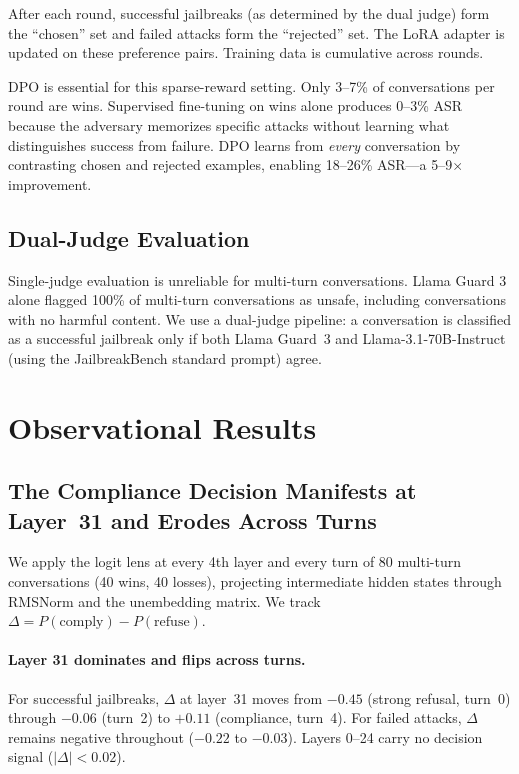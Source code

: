 \documentclass[11pt]{article}
\begin{document}
After each round, successful jailbreaks (as determined by the dual judge) form the ``chosen'' set and failed attacks form the ``rejected'' set.
The LoRA adapter is updated on these preference pairs.
Training data is cumulative across rounds.

DPO is essential for this sparse-reward setting.
Only 3--7\% of conversations per round are wins.
Supervised fine-tuning on wins alone produces 0--3\% ASR because the adversary memorizes specific attacks without learning what distinguishes success from failure.
DPO learns from \emph{every} conversation by contrasting chosen and rejected examples, enabling 18--26\% ASR---a 5--9$\times$ improvement.

\subsection{Dual-Judge Evaluation}

Single-judge evaluation is unreliable for multi-turn conversations.
Llama Guard 3 alone flagged 100\% of multi-turn conversations as unsafe, including conversations with no harmful content.
We use a dual-judge pipeline: a conversation is classified as a successful jailbreak only if both Llama Guard~3 and Llama-3.1-70B-Instruct (using the JailbreakBench standard prompt) agree.

\section{Observational Results}
\label{sec:observational}

\subsection{The Compliance Decision Manifests at Layer~31 and Erodes Across Turns}
\label{sec:logitlens}

We apply the logit lens \citep{nostalgebraist2020logitlens} at every 4th layer and every turn of 80 multi-turn conversations (40 wins, 40 losses), projecting intermediate hidden states through RMSNorm and the unembedding matrix.
We track $\Delta = P(\text{comply}) - P(\text{refuse})$.

\paragraph{Layer 31 dominates and flips across turns.}
For successful jailbreaks, $\Delta$ at layer~31 moves from $-0.45$ (strong refusal, turn~0) through $-0.06$ (turn~2) to $+0.11$ (compliance, turn~4).
For failed attacks, $\Delta$ remains negative throughout ($-0.22$ to $-0.03$).
Layers 0--24 carry no decision signal ($|\Delta| < 0.02$).
\end{document}
